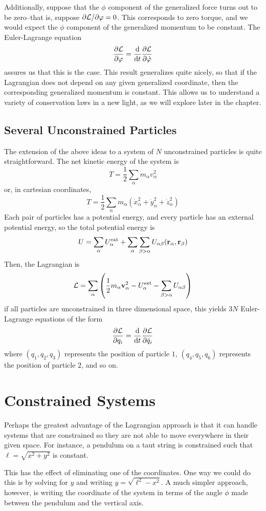 Additionally, suppose that the $\phi$ component of the generalized force turns out to be zero--that is, suppose $\partial \mathcal{L}/\partial \varphi = 0$. This corresponds to zero torque, and we would expect the $\phi$ component of the generalized momentum to be constant. The Euler-Lagrange equation
\[ \pdv{\mathcal{L}}{\varphi} = \dv{t} \pdv{\mathcal{L}}{\dot {\varphi}} \]
assures us that this is the case. This result generalizes quite nicely, so that if the Lagrangian does not depend on any given generalized coordinate, then the corresponding generalized momentum is constant. This allows us to understand a variety of conservation laws in a new light, as we will explore later in the chapter. 
\subsection*{Several Unconstrained Particles}
The extension of the above ideas to a system of $N$ unconstrained particles is quite straightforward. The net kinetic energy of the system is
\[ T = \frac{1}{2}\sum_\alpha m_\alpha v_\alpha^2 \]
or, in cartesian coordinates,
\[ T = \frac{1}{2}\sum_\alpha m_\alpha (\dot x_\alpha^2 + \dot y_\alpha^2 + \dot z_\alpha ^2) \]
Each pair of particles has a potential energy, and every particle has an external potential energy, so the total potential energy is
\[ U = \sum_\alpha U_\alpha^\text{ext} + \sum_\alpha \sum_{\beta > \alpha} U_{\alpha\beta}(\mathbf{r}_\alpha, \mathbf{r}_\beta)  \]
Then, the Lagrangian is
\[ \L = \sum_\alpha\pqty{ \frac{1}{2}m_\alpha\mbf v_\alpha ^2 - U_\alpha^\text{ext} - \sum_{\beta>\alpha} U_{\alpha\beta}}\]
if all particles are unconstrained in three dimensional space, this yields $3N$ Euler-Lagrange equations of the form
\[ \pdv{\mathcal{L}}{q_i} = \dv{t} \pdv{\mathcal{L}}{\dot q_i }\]
where $(q_1, q_2, q_3)$ represents the position of particle $1$, $(q_4, q_5, q_6)$ represents the position of particle $2$, and so on.
\section{Constrained Systems}
Perhaps the greatest advantage of the Lagrangian approach is that it can handle systems that are constrained so they are not able to move everywhere in their given space. For instance, a pendulum on a taut string is constrained such that $\ell = \sqrt{x^2+y^2}$ is constant. 

This has the effect of eliminating one of the coordinates. One way we could do this is by solving for $y$ and writing $y = \sqrt{\ell^2 - x^2}$. A much simpler approach, however, is writing the coordinate of the system in terms of the angle $\phi$ made between the pendulum and the vertical axis.

